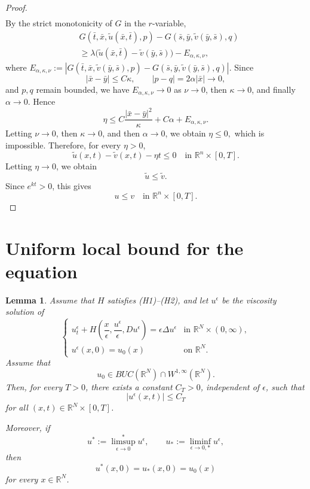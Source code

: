 \documentclass[preprint]{elsarticle}
\newtheorem{lemma}{Lemma}[section]
\numberwithin{equation}{section}
\begin{document}
\begin{proof}
\[\begin{aligned}
\end{aligned}
\]
By the strict monotonicity of \(G\) in the \(r\)-variable,
\[
\begin{aligned}
 &G(\bar t,\bar x,\widetilde u(\bar x,\bar t),p)
 -
 G(\bar s,\bar y,\widetilde v(\bar y,\bar s),q)\\
 &\ge
 \lambda\bigl(\widetilde u(\bar x,\bar t)-\widetilde v(\bar y,\bar s)\bigr)
 -
 E_{\alpha,\kappa,\nu},
\end{aligned}
\]
where $ E_{\alpha,\kappa,\nu}
 :=
 \left|
 G(\bar t,\bar x,\widetilde v(\bar y,\bar s),p)
 -
 G(\bar s,\bar y,\widetilde v(\bar y,\bar s),q)
 \right|.$
Since
\[
 |\bar x-\bar y|\le C\kappa,
 \qquad
 |p-q|=2\alpha|\bar x|\to0,
\]
and \(p,q\) remain bounded, we have $E_{\alpha,\kappa,\nu}\to0$
as \(\nu\to0\), then \(\kappa\to0\), and finally \(\alpha\to0\). Hence
\[
 \eta
 \le
 C\frac{|\bar x-\bar y|^2}{\kappa}+C\alpha+E_{\alpha,\kappa,\nu}.
\]
Letting \(\nu\to0\), then \(\kappa\to0\), and then \(\alpha\to0\), we obtain $\eta\le0,$
which is impossible. Therefore, for every \(\eta>0\),
\[
 \widetilde u(x,t)-\widetilde v(x,t)-\eta t\le0
 \quad\text{in }\mathbb R^n\times[0,T].
\]
Letting \(\eta\to0\), we obtain
\[
 \widetilde u\le \widetilde v.
\]
Since \(e^{kt}>0\), this gives
\[
 u\le v
 \quad\text{in }\mathbb R^n\times[0,T].
\]
\end{proof}

\section{Uniform local bound for the equation}

\begin{lemma}\label{lem:initial-trace}
Assume that $H$ satisfies \textup{(H1)}--\textup{(H2)}, and let $u^\epsilon$ be the viscosity solution of
\begin{equation*}
\begin{cases}
u_t^\epsilon
+
H\left(
\dfrac{x}{\epsilon},
\dfrac{u^\epsilon}{\epsilon},
Du^\epsilon
\right)
=
\epsilon\Delta u^\epsilon
&\text{in }\mathbb R^N\times(0,\infty),
\\[2mm]
u^\epsilon(x,0)=u_0(x)
&\text{on }\mathbb R^N.
\end{cases}
\end{equation*}
Assume that
$$
u_0\in BUC(\mathbb R^N)\cap W^{1,\infty}(\mathbb R^N).
$$
Then, for every $T>0$, there exists a constant $C_T>0$, independent of $\epsilon$, such that
\begin{equation*}
|u^\epsilon(x,t)|\le C_T
\end{equation*}
for all $(x,t)\in\mathbb R^N\times[0,T]$.

Moreover, if
\begin{equation*}
u^*:={\limsup}_{\epsilon\to0}^{*}u^\epsilon,
\qquad
u_*:={\liminf}_{\epsilon\to0,*}u^\epsilon,
\end{equation*}
then
\begin{equation*}
u^*(x,0)=u_*(x,0)=u_0(x)
\end{equation*}
for every $x\in\mathbb R^N$.
\end{lemma}
\end{document}
